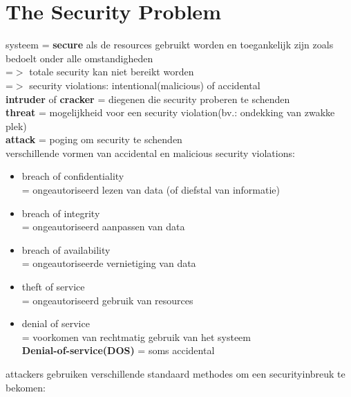 \documentclass{report}
\begin{document}
\section{The Security Problem}
systeem = \textbf{secure} als de resources gebruikt worden en toegankelijk zijn zoals bedoelt onder alle omstandigheden
\\=$>$ totale security kan niet bereikt worden
\\=$>$ security violations: intentional(malicious) of accidental
\\\textbf{intruder} of \textbf{cracker} = diegenen die security proberen te schenden
\\\textbf{threat} = mogelijkheid voor een security violation(bv.: ondekking van zwakke plek)
\\\textbf{attack} = poging om security te schenden
\\verschillende vormen van accidental en malicious security violations:
\begin{itemize}
\item breach of confidentiality
\\= ongeautoriseerd lezen van data (of diefstal van informatie)
\item breach of integrity
\\= ongeautoriseerd aanpassen van data
\item breach of availability
\\= ongeautoriseerde vernietiging van data
\item theft of service
\\ = ongeautoriseerd gebruik van resources
\item denial of service
\\= voorkomen van rechtmatig gebruik van het systeem
\\\textbf{Denial-of-service(DOS)} = soms accidental
\end{itemize}
attackers gebruiken verschillende standaard methodes om een securityinbreuk te bekomen:
\end{document}
